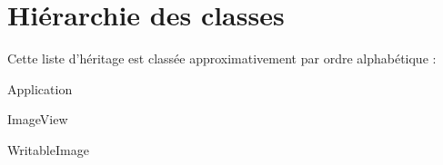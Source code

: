 \section{Hiérarchie des classes}
Cette liste d'héritage est classée approximativement par ordre alphabétique \-:\begin{DoxyCompactList}
\item {}
\item Application\begin{DoxyCompactList}
\item {}
\end{DoxyCompactList}
\item Image\-View\begin{DoxyCompactList}
\item {}
\begin{DoxyCompactList}
\item {}
\item {}
\item {}
\end{DoxyCompactList}
\item {}
\end{DoxyCompactList}
\item Writable\-Image\begin{DoxyCompactList}
\item {}
\end{DoxyCompactList}
\end{DoxyCompactList}
